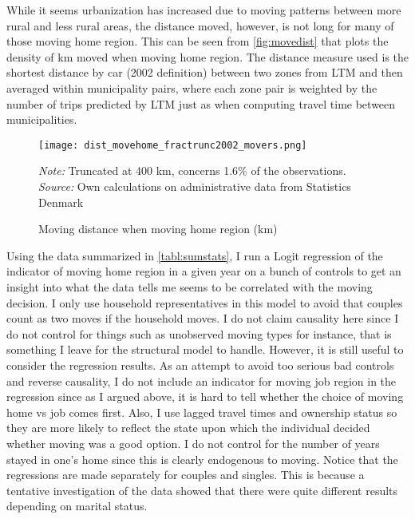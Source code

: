 While it seems urbanization has increased due to moving patterns between more rural and less rural areas, the distance moved, however, is not long for many of those moving home region. This can be seen from \autoref{fig:movedist} that plots the density of km moved when moving home region. The distance measure used is the shortest distance by car (2002 definition) between two zones from LTM and then averaged within municipality pairs, where each zone pair is weighted by the number of trips predicted by LTM just as when computing travel time between municipalities. 

\begin{figure}
\centering
\begin{minipage}{0.55\textwidth}
\texttt{[image: dist\_movehome\_fractrunc2002\_movers.png]} 
{\tiny \emph{Note:} Truncated at 400 km, concerns 1.6\% of the observations. \emph{Source:} Own calculations on administrative data from Statistics Denmark\par}
\end{minipage}
\caption{Moving distance when moving home region (km)}
\label{fig:movedist}
\end{figure}


Using the data summarized in \autoref{tabl:sumstats}, I run a Logit regression of the indicator of moving home region in a given year on a bunch of controls to get an insight into what the data tells me seems to be correlated with the moving decision. I only use household representatives in this model to avoid that couples count as two moves if the household moves. I do not claim causality here since I do not control for things such as unobserved moving types for instance, that is something I leave for the structural model to handle. However, it is still useful to consider the regression results. As an attempt to avoid too serious bad controls and reverse causality, I do not include an indicator for moving job region in the regression since as I argued above, it is hard to tell whether the choice of moving home vs job comes first. Also, I use lagged travel times and ownership status so they are more likely to reflect the state upon which the individual decided whether moving was a good option. I do not control for the number of years stayed in one's home since this is clearly endogenous to moving. Notice that the regressions are made separately for couples and singles. This is because a tentative investigation of the data showed that there were quite different results depending on marital status. 


